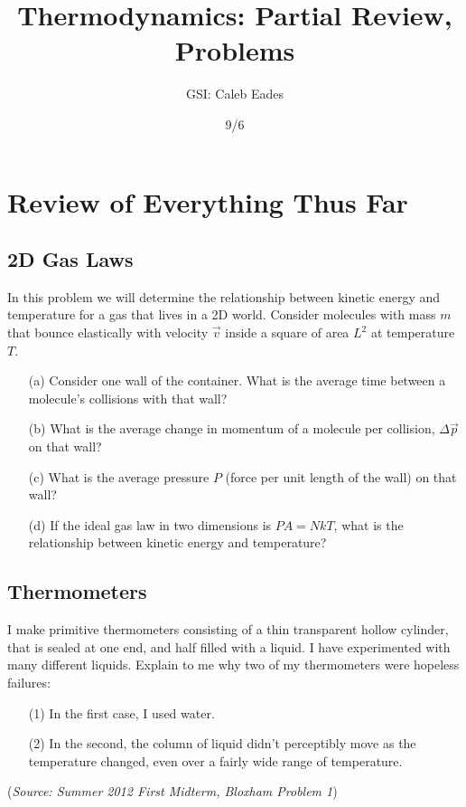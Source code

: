 \documentclass{article}
\begin{document}
	
\title{Thermodynamics: Partial Review, Problems}
\author{GSI: Caleb Eades}
\date{9/6}
\maketitle

\section{Review of Everything Thus Far}

\subsection{2D Gas Laws}

In this problem we will determine the relationship between kinetic energy and temperature for a gas that lives in a 2D world. Consider molecules with mass $m$ that bounce elastically with velocity $\vec{v}$ inside a square of area $L^2$ at temperature $T$.

\begin{itemize}
	\item[(a)] Consider one wall of the container. What is the average time between a molecule's collisions with that wall?
	\item[(b)] What is the average change in momentum of a molecule per collision, $\Delta\vec{p}$ on that wall?
	\item[(c)] What is the average pressure $P$ (force per unit length of the wall) on that wall?
	\item[(d)] If the ideal gas law in two dimensions is $PA = NkT$, what is the relationship between kinetic energy and temperature?
\end{itemize}

\subsection{Thermometers}

I make primitive thermometers consisting of a thin transparent hollow cylinder, that is sealed at one end, and half filled with a liquid. I have experimented with many different liquids. Explain to me why two of my thermometers were hopeless failures:
\begin{itemize}
	\item[(1)] In the first case, I used water.
	\item[(2)] In the second, the column of liquid didn't perceptibly move as the temperature changed, even over a fairly wide range of temperature.
\end{itemize}
(\textit{Source: Summer 2012 First Midterm, Bloxham Problem 1})
\end{document}
